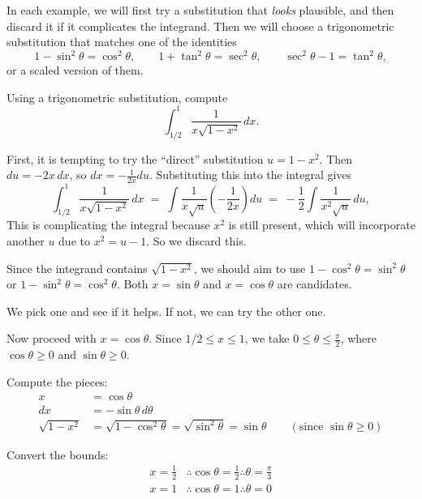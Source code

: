 In each example, we will first try a substitution that \emph{looks} plausible, and then discard it if it complicates the integrand. 
Then we will choose a trigonometric substitution that matches one of the identities
\[
1-\sin^2\theta=\cos^2\theta,\qquad 1+\tan^2\theta=\sec^2\theta,\qquad \sec^2\theta-1=\tan^2\theta,
\]
or a scaled version of them.

\begin{example}
    Using a trigonometric substitution, compute
    \[
        \int_{1/2}^{1}\frac{1}{x\sqrt{1-x^2}}\,dx.
    \]

\end{example}

\begin{solution}
    First, it is tempting to try the ``direct'' substitution $u=1-x^2$. Then $du=-2x\,dx$, so $dx = -\frac{1}{2x}du$.
    Substituting this into the integral gives
    \[
        \int_{1/2}^{1}\frac{1}{x\sqrt{1-x^2}}\,dx
        \;=\;\int \frac{1}{x\sqrt{u}}\left(-\frac{1}{2x}\right)du
        \;=\;-\frac{1}{2}\int \frac{1}{x^2\sqrt{u}}\,du,
    \]
    This is complicating the integral because $x^2$ is still present, which will incorporate another $u$ due to $x^2 = u-1$. So we discard this.

    Since the integrand contains $\sqrt{1-x^2}$, we should aim to use $1-\cos^2\theta=\sin^2\theta$ or $1-\sin^2\theta=\cos^2\theta$.
    Both $x=\sin\theta$ and $x=\cos\theta$ are candidates.

    We pick one and see if it helps. If not, we can try the other one.

    Now proceed with $x=\cos\theta$. Since $1/2\leq x\leq 1$, we take $0\leq \theta\leq\frac{\pi}{2}$, where $\cos\theta\ge 0$ and $\sin\theta\ge 0$.

    Compute the pieces:
    \begin{align*}
        x &= \cos\theta\\
        dx &= -\sin\theta\,d\theta\\
        \sqrt{1-x^2} &= \sqrt{1-\cos^2\theta}=\sqrt{\sin^2\theta}=\sin\theta \qquad (\text{since }\sin\theta\ge 0)
    \end{align*}

    Convert the bounds:
    \begin{align*}
        x=\frac{1}{2} &\therefore \cos\theta=\frac{1}{2}\therefore \theta=\frac{\pi}{3}\\
        x=1 &\therefore \cos\theta=1\therefore \theta=0
    \end{align*}


\end{solution}
